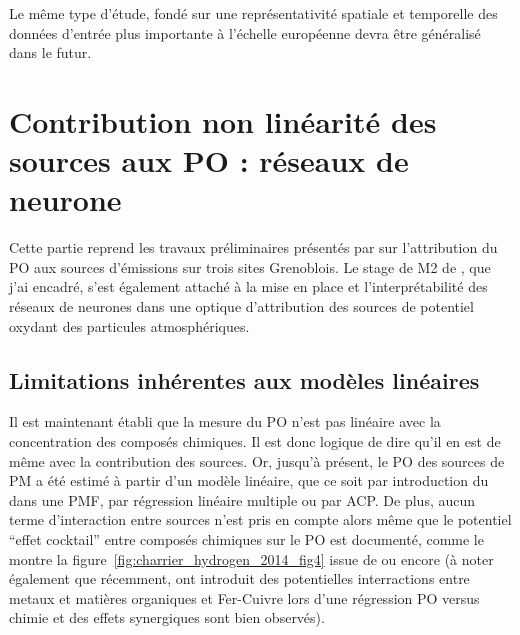 Le même type d'étude, fondé sur une représentativité spatiale et temporelle des données
d'entrée plus importante à l'échelle européenne devra être généralisé dans le futur.


\section{Contribution non linéarité des sources aux PO : réseaux de neurone}%
\label{sec:reseau_neurone}

\begin{tcolorbox}[colback=red!5!white,colframe=Melon,title=Note]
    Cette partie reprend les travaux préliminaires présentés par \cite{borlazaUrbaninprep.} sur 
    l'attribution du PO aux sources d'émissions sur trois sites Grenoblois. Le stage de M2 de
    \cite{fichesMachine2020}, que j'ai encadré, s'est également attaché à la mise en place et
    l'interprétabilité des réseaux de neurones dans une optique d'attribution des sources
    de potentiel oxydant des particules atmosphériques.
\end{tcolorbox}

\subsection{Limitations inhérentes aux modèles linéaires}%
\label{sub:limitations_inhérentes_aux_modèles_linéaires}


Il est maintenant établi que la mesure du PO n'est pas linéaire avec la concentration des composés
chimiques. Il est donc logique de dire qu'il en est de même avec la contribution des
sources.
Or, jusqu'à présent, le PO des sources de PM a été estimé à partir d'un modèle linéaire,
que ce soit par introduction du \POv{} dans une PMF, par régression linéaire multiple ou
par ACP.
De plus, aucun terme d'interaction entre sources n'est pris en compte alors même que
le potentiel ``effet cocktail'' entre composés chimiques sur le PO est documenté, comme le
montre la figure~\ref{fig:charrier_hydrogen_2014_fig4} issue de
\cite{charrierHydrogen2014} ou encore 
\cites[figure S7 du supplément]{charrierDithiothreitol2012}{xiongRethinking2017}{samakeUnexpected2017}{yuSynergistic2018}
(à noter également que récemment, \cite{gaoCharacterization2020} ont introduit des
potentielles interractions entre metaux et matières organiques et Fer-Cuivre lors d'une régression PO
versus chimie et des effets synergiques sont bien observés).

